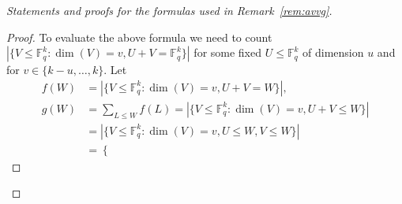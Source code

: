 \documentclass[11pt,a4paper,reqno,twoside]{amsart}
\theoremstyle{definition}
\newcommand{\F}{\mathbb{F}}
\begin{document}
\begin{appendix}
\begin{proof}[Statements and proofs for the formulas used in Remark~\ref{rem:avvg}]
\begin{proof}
To evaluate the above formula we need to count $|\{V \le \F_q^k : \dim(V)=v, U+V=\F_q^k\}|$ for some fixed $U \le \F_q^k$ of dimension $u$ and for $v \in \{k-u,\dots,k\}$. Let
\begin{align*}
    f(W)&=|\{V \le \F_q^k : \dim(V)=v, U+V=W\}|, \\
    g(W)&=\sum_{L \le W}f(L)=|\{V \le \F_q^k : \dim(V)=v, U+V\le W\}| \\
    &=|\{V \le \F_q^k : \dim(V)=v, U\le W, V \le W\}| \\
    &=\begin{cases}

\end{cases}
\end{align*}
\end{proof}
\end{proof}
\end{appendix}
\end{document}
